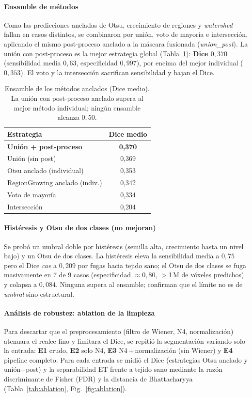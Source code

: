 \documentclass[conference]{IEEEtran}
\begin{document}
\paragraph{Ensamble de métodos} Como las predicciones ancladas de Otsu, crecimiento de
regiones y \textit{watershed} fallan en casos distintos, se combinaron por unión, voto de
mayoría e intersección, aplicando el mismo post-proceso anclado a la máscara fusionada
(\emph{union\_post}). La unión con post-proceso es la mejor estrategia global
(Tabla~\ref{tab:ensamble}): \textbf{Dice $0{,}370$} (sensibilidad media $0{,}63$,
especificidad $0{,}997$), por encima del mejor individual ($0{,}353$). El voto y la
intersección sacrifican sensibilidad y bajan el Dice.

\begin{table}[h]
\centering
\caption{Ensamble de los métodos anclados (Dice medio). La unión con post-proceso anclado
supera al mejor método individual; ningún ensamble alcanza $0{,}50$.}
\label{tab:ensamble}
\begin{tabular}{lc}
\toprule
Estrategia & Dice medio \\
\midrule
\textbf{Unión + post-proceso} & \textbf{0,370} \\
Unión (sin post)             & 0,369 \\
Otsu anclado (individual)    & 0,353 \\
RegionGrowing anclado (indiv.) & 0,342 \\
Voto de mayoría              & 0,334 \\
Intersección                 & 0,204 \\
\bottomrule
\end{tabular}
\end{table}

\paragraph{Histéresis y Otsu de dos clases (no mejoran)} Se probó un umbral doble por
histéresis (semilla alta, crecimiento hasta un nivel bajo) y un Otsu de dos clases. La
histéresis eleva la sensibilidad media a $0{,}75$ pero el Dice \emph{cae} a $0{,}209$ por
fugas hacia tejido sano; el Otsu de dos clases se fuga masivamente en 7 de 9 casos
(especificidad $\approx0{,}80$, $>$1\,M de vóxeles predichos) y colapsa a $0{,}084$.
Ninguna supera al ensamble; confirman que el límite no es de \emph{umbral} sino estructural.

\paragraph{Análisis de robustez: ablation de la limpieza} Para descartar que el
preprocesamiento (filtro de Wiener, N4, normalización) atenuara el realce fino y limitara
el Dice, se repitió la segmentación variando solo la entrada: \textbf{E1} crudo,
\textbf{E2} solo N4, \textbf{E3} N4\,+\,normalización (sin Wiener) y \textbf{E4} pipeline
completo. Para cada entrada se midió el Dice (estrategias Otsu anclado y unión+post) y la
separabilidad ET frente a tejido sano mediante la razón discriminante de Fisher (FDR) y la
distancia de Bhattacharyya (Tabla~\ref{tab:ablation}, Fig.~\ref{fig:ablation}).
\end{document}
